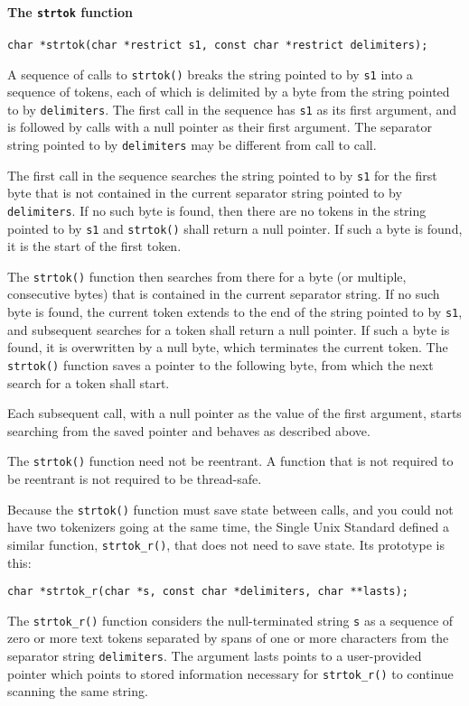 \paragraph{The \texttt{strtok} function}
\texttt{char *strtok(char *restrict s1, const char *restrict delimiters);}

A sequence of calls to \texttt{strtok()} breaks the string pointed to by
\texttt{s1} into a sequence of tokens, each of which is delimited by a byte
from the string pointed to by \texttt{delimiters}. The first call in the
sequence has \texttt{s1} as its first argument, and is followed by calls with a
null pointer as their first argument. The separator string pointed to by
\texttt{delimiters} may be different from call to call.

The first call in the sequence searches the string pointed to by \texttt{s1}
for the first byte that is not contained in the current separator string
pointed to by \texttt{delimiters}. If no such byte is found, then there are no
tokens in the string pointed to by \texttt{s1} and \texttt{strtok()} shall
return a null pointer. If such a byte is found, it is the start of the first
token.

The \texttt{strtok()} function then searches from there for a byte (or
multiple, consecutive bytes) that is contained in the current separator string.
If no such byte is found, the current token extends to the end of the string
pointed to by \texttt{s1}, and subsequent searches for a token shall return a
null pointer. If such a byte is found, it is overwritten by a null byte, which
terminates the current token. The \texttt{strtok()} function saves a pointer to
the following byte, from which the next search for a token shall start.

Each subsequent call, with a null pointer as the value of the first argument,
starts searching from the saved pointer and behaves as described above.

The \texttt{strtok()} function need not be reentrant. A function that is not
required to be reentrant is not required to be thread-safe.

Because the \texttt{strtok()} function must save state between calls, and you
could not have two tokenizers going at the same time, the Single Unix Standard
defined a similar function, \texttt{strtok\_r()}, that does not need to save
state. Its prototype is this:

\texttt{char *strtok\_r(char *s, const char *delimiters, char **lasts);}

The \texttt{strtok\_r()} function considers the null-terminated string
\texttt{s} as a sequence of zero or more text tokens separated by spans of one
or more characters from the separator string \texttt{delimiters}. The argument
lasts points to a user-provided pointer which points to stored information
necessary for \texttt{strtok\_r()} to continue scanning the same string.

